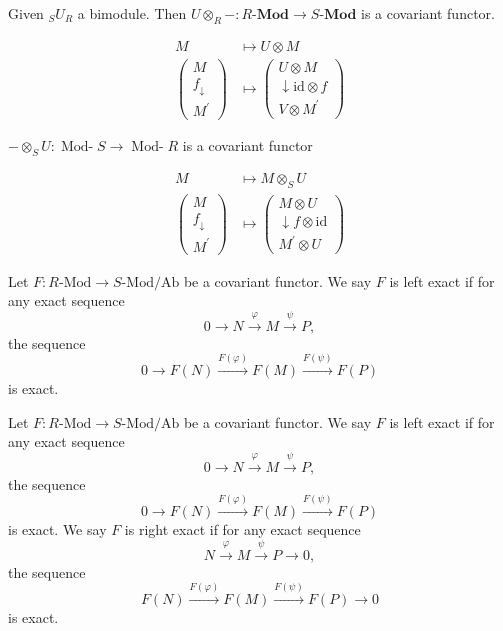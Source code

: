 \documentclass[11pt, a4paper]{report}
\begin{document}
\begin{example}
Given ${}_{S}U_{R}$ a bimodule. Then $U \otimes_{R}-: R\text{-}\textbf{Mod} \rightarrow S\text{-}\textbf{Mod}$ is a covariant functor.
\end{example}
\[
\begin{aligned}
M & \mapsto U \otimes M \\
\left(\begin{array}{c}
M \\
f_{\downarrow} \\
M^{\prime}
\end{array}\right) & \mapsto\left(\begin{array}{c}
U \otimes M \\
\downarrow \mathrm{id} \otimes f \\
V \otimes M^{\prime}
\end{array}\right)
\end{aligned}
\]

$-\otimes_{S} U: \operatorname{Mod-}S \rightarrow \operatorname{Mod-}R$ is a covariant functor

\[
\begin{aligned}
M & \mapsto M \otimes_{S} U \\
\left(\begin{array}{c}
M \\
f_{\downarrow} \\
M^{\prime}
\end{array}\right) & \mapsto\left(\begin{array}{c}
M \otimes U \\
\downarrow f \otimes \mathrm{id} \\
M^{\prime} \otimes U
\end{array}\right)
\end{aligned}
\]


\begin{definition}
Let $F: R\text{-}\mathrm{Mod} \rightarrow S\text{-}\mathrm{Mod}/\mathrm{Ab}$ be a covariant functor. We say $F$ is left exact if for any exact sequence
\[ 0 \rightarrow N \xrightarrow{\varphi} M \xrightarrow{\psi} P, \]
the sequence
\[ 0 \rightarrow F(N) \xrightarrow{F(\varphi)} F(M) \xrightarrow{F(\psi)} F(P) \]
is exact.
\end{definition}

Let $F: R\text{-}\mathrm{Mod} \rightarrow S\text{-}\mathrm{Mod}/\mathrm{Ab}$ be a covariant functor. We say $F$ is left exact if for any exact sequence
\[ 0 \rightarrow N \xrightarrow{\varphi} M \xrightarrow{\psi} P, \]
the sequence
\[ 0 \rightarrow F(N) \xrightarrow{F(\varphi)} F(M) \xrightarrow{F(\psi)} F(P) \]
is exact. We say $F$ is right exact if for any exact sequence
\[ N \xrightarrow{\varphi} M \xrightarrow{\psi} P \rightarrow 0, \]
the sequence
\[ F(N) \xrightarrow{F(\varphi)} F(M) \xrightarrow{F(\psi)} F(P) \rightarrow 0 \]
is exact.
\end{document}
